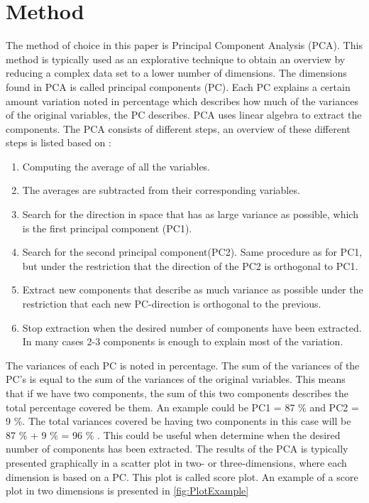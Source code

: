 \section*{Method}
\label{Method}
%
The method of choice in this paper is Principal Component Analysis (PCA). This method is typically used as an explorative technique to obtain an overview by reducing a complex data set to a lower number of dimensions. The dimensions found in PCA is called principal components (PC). Each PC explains a certain amount variation noted in percentage which describes how much of the variances of the original variables, the PC describes.\blankline
%
PCA uses linear algebra to extract the components. The PCA consists of different steps, an overview of these different steps is listed based on \textcite[pp. 211-213]{Naes2010}:

\begin{enumerate}
	\item Computing the average of all the variables. 
	\item The averages are subtracted from their corresponding variables.
	\item Search for the direction in space that has as large variance as possible, which is the first principal component (PC1).
	\item Search for the second principal component(PC2). Same procedure as for PC1, but under the restriction that the direction of the PC2 is orthogonal to PC1. 
	\item Extract new components that describe as much variance as possible under the restriction that each new PC-direction is orthogonal to the previous.
	\item Stop extraction when the desired number of components have been extracted. In many cases 2-3 components is enough to explain most of the variation. 
\end{enumerate}
\blankline
%
The variances of each PC is noted in percentage.
The sum of the variances of the PC's is equal to the sum of the variances of the original variables. This means that if we have two components, the sum of this two components describes the total percentage covered be them. An example could be PC1 = 87 \% and PC2 = 9 \%. The total variances covered be having two components in this case will be 87 \% + 9 \% = 96 \% \parencite[p. 213]{Naes2010}. This could be useful when determine when the desired number of components has been extracted. \blankline
%
The results of the PCA is typically presented graphically in a scatter plot in two- or three-dimensions, where each dimension is based on a PC. This plot is called score plot. An example of a score plot in two dimensions is presented in \autoref{fig:PlotExample}
